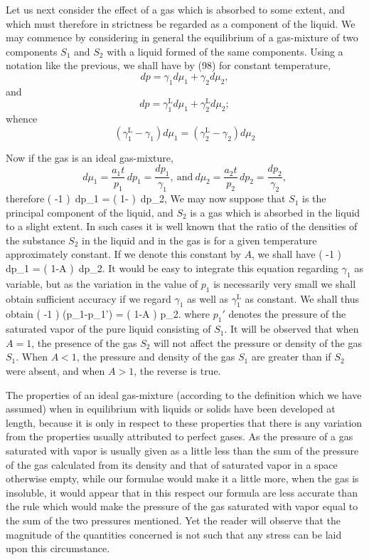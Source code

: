 \documentclass[12pt]{article}
\begin{document}
Let us next consider the effect of a gas which is absorbed to some extent, and which must therefore in strictness be regarded as a component of the liquid. We may commence by considering in general the equilibrium of a gas-mixture of two components $S_1$ and $S_2$ with a liquid formed of the same components. Using a notation like the previous, we shall have by (98) for constant temperature,
$$dp = \gamma_1 d \mu_1 + \gamma_2 d\mu_2,  $$
and                  $$dp = \gamma_1^{\text{L}} d \mu_1 + \gamma_2^{\text{L}} d\mu_2;$$
whence             $$(\gamma_1^\text{L} - \gamma_1) d\mu_1 = (\gamma_2^\text{L} - \gamma_2) d\mu_2$$

Now if the gas is an ideal gas-mixture,
$$ d \mu_1 = \frac{a_1 t}{p_1}  \, dp_1 = \frac{dp_1}{\gamma_1},  \ \text{and} \ d \mu_2 = \frac{a_2 t}{p_2}  \, dp_2  =\frac{dp_2}{\gamma_2},  $$ 
therefore 
\eqs   \left(  -1 \right)\, dp_1 =  \left( 1-  \right)\, dp_2,     \label{288}\eqe
We may now suppose that $S_1$ is the principal component of the liquid, and $S_2$ is a gas which is absorbed in the liquid to a slight extent. In such cases it is well known that the ratio of the densities of the substance $S_2$ in the liquid and in the gas is for a given temperature approximately constant. If we denote this constant by $A$, we shall have
\eqs \left(  -1 \right)\, dp_1 =  \left( 1-A \right)\, dp_2.  \label{289}\eqe
It would be easy to integrate this equation regarding $\gamma_1$ as variable, but as the variation in the value of $p_1$ is necessarily very small we shall obtain sufficient accuracy if we regard $\gamma_1$ as well as $\gamma_1^\text{L}$ as constant. We shall thus obtain
\eqs  \left(  -1 \right) (p_1-p_1') =  \left( 1-A \right) p_2.  \label{290}\eqe
where $p_1'$ denotes the pressure of the saturated vapor of the pure liquid consisting of $S_1$. It will be observed that when $A =1$, the presence of the gas $S_2$ will not affect the pressure or density of the gas $S_1$. When $A < 1$, the pressure and density of the gas $S_1$ are greater than if $S_2$ were absent, and when $A > 1$, the reverse is true.


The properties of an ideal gas-mixture (according to the definition which we have assumed) when in equilibrium with liquids or solids have been developed at length, because it is only in respect to these properties that there is any variation from the properties usually attributed to perfect gases. As the pressure of a gas saturated with vapor is usually given as a little less than the sum of the pressure of the gas calculated from its density and that of saturated vapor in a space otherwise empty, while our formulae would make it a little more, when the gas is insoluble, it would appear that in this respect our formula are less accurate than the rule which would make the pressure of the gas saturated with vapor equal to the sum of the two pressures mentioned. Yet the reader will observe that the magnitude of the quantities concerned is not such that any stress can be laid upon this circumstance.
\end{document}
